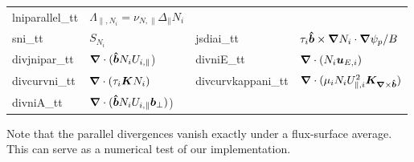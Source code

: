 \begin{longtable}{llll}
    lniparallel\_tt &$ \Lambda_{\parallel,N_i} = \nu_{N,\parallel} \Delta_\parallel N_i$ \\
    sni\_tt & $S_{N_i}$ &
    jsdiai\_tt & $\tau_i \bm{\hat{b}} \times {\boldsymbol{\nabla}} N_i \cdot{\boldsymbol{\nabla}} \psi_p /B$\\
    divjnipar\_tt & ${\boldsymbol{\nabla}}\cdot (\bm{\hat{b}} N_i U_{i,\parallel}$) &
    divniE\_tt & ${\boldsymbol{\nabla}}\cdot ( N_i {\boldsymbol{u}}_{E,i})$ \\
    divcurvni\_tt & ${\boldsymbol{\nabla}}\cdot( \tau_i {\boldsymbol{K}} N_i)$ &
    divcurvkappani\_tt & ${\boldsymbol{\nabla}}\cdot( \mu_i N_i U_{\parallel,i}^2 {{\boldsymbol{K}}_{{\boldsymbol{\nabla}}\times\bm{\hat{b}}}})$ \\
    divniA\_tt & ${\boldsymbol{\nabla}}\cdot (\bm{\hat{b}} N_i U_{i,\parallel} {{\boldsymbol{b}}}_\perp)$) &
     &  \\
\bottomrule
\end{longtable}

Note that the parallel divergences vanish exactly under a flux-surface average. This can serve as a numerical test of our implementation.
